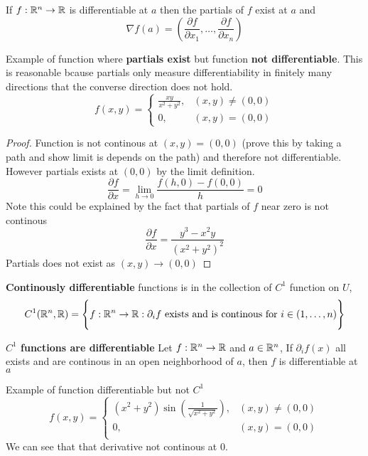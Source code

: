 \documentclass[11pt]{article}
\begin{document}
\begin{theorem}
  \label{multivariable function gradient}
  If $f:\mathbb{R}^n\to \mathbb{R}$ is differentiable at $a$ then the partials of $f$ exist at $a$ and
  \[
    \nabla f(a) = (\frac{\partial f}{\partial x_1}, \dots, \frac{\partial f}{\partial x_n})
  \]
\end{theorem}

\begin{rem}
  $ $\\
  Example of function where \textbf{partials exist} but function \textbf{not differentiable}. This is reasonable bcause partials only measure differentiability in finitely many directions that the converse direction does not hold.
  \[
    f(x,y) =
    \begin{cases}
      \frac{xy}{x^2 + y^2}, & (x,y) \neq (0,0)\\
      0, & (x,y)= (0,0)
    \end{cases}
  \]
  \begin{proof}
    Function is not continous at $(x,y)= (0,0)$ (prove this by taking a path and show limit is depends on the path) and therefore not differentiable. However partials exists at $(0,0)$ by the limit definition.
    \[
      \frac{\partial f}{\partial x} = \lim_{h\to 0} \frac{f(h,0) - f(0,0)}{h} = 0
    \]
    $ $\\
    Note this could be explained by the fact that partials of $f$ near zero is not continous
    \[
      \frac{\partial f}{\partial x} = \frac{y^3 - x^2y}{(x^2 + y^2)^2}
    \]
    Partials does not exist as $(x,y)\to (0,0)$
  \end{proof}

\end{rem}


\begin{defn}
  \label{c1 function} \textbf{Continously differentiable} functions is in the collection of $C^1$ function on $U$,
  \[
    C^1(\mathbb{R}^n, \mathbb{R}) = \Bigg\{ f:\mathbb{R}^n\to \mathbb{R}: \partial_i f \text{ exists and is continous for } i\in (1,\dots,n) \Bigg\}
  \]
\end{defn}


\begin{theorem}
  \label{C1 implies differentiability} \textbf{$C^1$ functions are differentiable}
  Let $f:\mathbb{R}^n\to\mathbb{R}$ and $a\in\mathbb{R}^n$, If $\partial_i f(x)$ all exists and are continous in an open neighborhood of $a$, then $f$ is differentiable at $a$
\end{theorem}


\begin{rem}
  Example of function differentiable but not $C^1$
  \[
    f(x,y) =
    \begin{cases}
      (x^2 + y^2)\sin(\frac{1}{\sqrt{x^2 + y^2}}), & (x,y)\neq (0,0)\\
      0,& (x,y) = (0,0)\\
    \end{cases}
  \]
  We can see that that derivative not continous at 0.
\end{rem}
\end{document}

